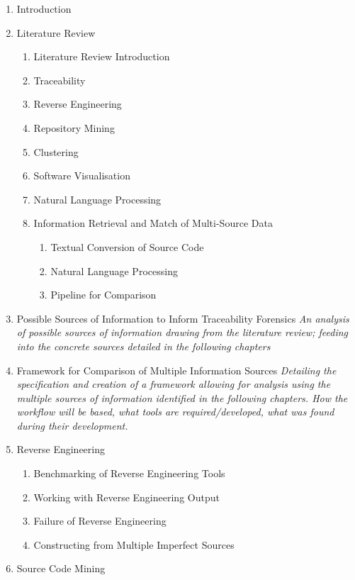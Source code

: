 \label{proposedstructure}

\begin{enumerate}
\item Introduction
\item Literature Review
\begin{enumerate}
\item Literature Review Introduction
\item Traceability
\item Reverse Engineering
\item Repository Mining
\item Clustering
\item Software Visualisation
\item Natural Language Processing
\item Information Retrieval and Match of Multi-Source Data
\begin{enumerate}
\item Textual Conversion of Source Code
\item Natural Language Processing
\item Pipeline for Comparison
\end{enumerate}
\end{enumerate}
\item Possible Sources of Information to Inform Traceability Forensics\newline
\textit{An analysis of possible sources of information drawing from the literature review; feeding into the concrete sources detailed in the following chapters}
\item Framework for Comparison of Multiple Information Sources\newline
\textit{Detailing the specification and creation of a framework allowing for analysis using the multiple sources of information identified in the following chapters. How the workflow will be based, what tools are required/developed, what was found during their development.}
\item Reverse Engineering
\begin{enumerate}
\item Benchmarking of Reverse Engineering Tools
\item Working with Reverse Engineering Output
\item Failure of Reverse Engineering
\item Constructing from Multiple Imperfect Sources
\end{enumerate}
\item Source Code Mining
\begin{enumerate}

\end{enumerate}
\end{enumerate}
